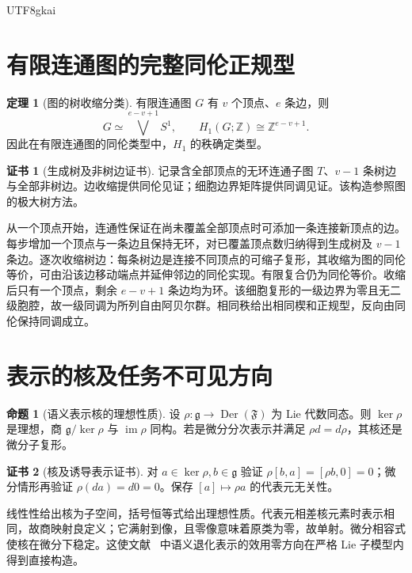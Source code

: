 \documentclass[12pt]{report}
\makeatletter
\theoremstyle{definition}
\newtheorem{theorem}{定理}[chapter]
\newtheorem{proposition}{命题}[chapter]
\newtheorem{Certificate}{证书}[chapter]
\renewenvironment{proof}[1][\proofname]{\par
  \pushQED{\qed}\normalfont
  \topsep6\p@\@plus6\p@\relax
  \trivlist
  \item[\hskip\labelsep\normalfont #1\@addpunct{.}]\ignorespaces
}{
  \popQED\endtrivlist\@endpefalse
}
\newcommand{\ZZ}{\mathbb Z}
\newcommand{\im}{\operatorname{im}}
\makeatother
\begin{document}
\begin{CJK*}{UTF8}{gkai}
\section{有限连通图的完整同伦正规型}
\begin{theorem}[图的树收缩分类]
\label{thm:graph}
有限连通图 \(G\) 有 \(v\) 个顶点、\(e\) 条边，则
\[
G\simeq\bigvee^{e-v+1}S^1,\qquad H_1(G;\ZZ)\cong\ZZ^{e-v+1}.
\]
因此在有限连通图的同伦类型中，\(H_1\) 的秩确定类型。
\end{theorem}
\begin{Certificate}[生成树及非树边证书]
记录含全部顶点的无环连通子图 \(T\)、\(v-1\) 条树边与全部非树边。边收缩提供同伦见证；细胞边界矩阵提供同调见证。该构造参照图的极大树方法\cite{hatcher}。
\end{Certificate}
\begin{proof}
从一个顶点开始，连通性保证在尚未覆盖全部顶点时可添加一条连接新顶点的边。每步增加一个顶点与一条边且保持无环，对已覆盖顶点数归纳得到生成树及 \(v-1\) 条边。逐次收缩树边：每条树边是连接不同顶点的可缩子复形，其收缩为图的同伦等价，可由沿该边移动端点并延伸邻边的同伦实现。有限复合仍为同伦等价。收缩后只有一个顶点，剩余 \(e-v+1\) 条边均为环。该细胞复形的一级边界为零且无二级胞腔，故一级同调为所列自由阿贝尔群。相同秩给出相同楔和正规型，反向由同伦保持同调成立。
\end{proof}

\section{表示的核及任务不可见方向}
\begin{proposition}[语义表示核的理想性质]
\label{prop:kernel}
设 \(\rho:\mathfrak g\to\operatorname{Der}(\mathfrak F)\) 为 Lie 代数同态。则 \(\ker\rho\) 是理想，商 \(\mathfrak g/\ker\rho\) 与 \(\im\rho\) 同构。若是微分分次表示并满足 \(\rho d=d\rho\)，其核还是微分子复形。
\end{proposition}
\begin{Certificate}[核及诱导表示证书]
对 \(a\in\ker\rho,b\in\mathfrak g\) 验证
\(\rho[b,a]=[\rho b,0]=0\)；微分情形再验证 \(\rho(da)=d0=0\)。保存 \([a]\mapsto\rho a\) 的代表元无关性。
\end{Certificate}
\begin{proof}
线性性给出核为子空间，括号恒等式给出理想性质。代表元相差核元素时表示相同，故商映射良定义；它满射到像，且零像意味着原类为零，故单射。微分相容式使核在微分下稳定。这使文献~\cite{app3} 中语义退化表示的效用零方向在严格 Lie 子模型内得到直接构造。
\end{proof}


\end{CJK*}
\end{document}
